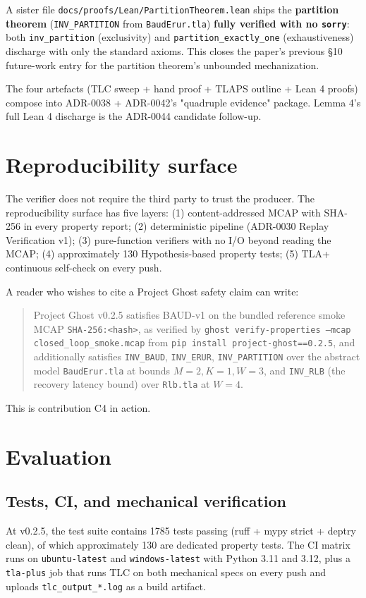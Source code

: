 \documentclass[acmsmall,nonacm=true,review=false]{acmart}
\theoremstyle{plain}
\begin{document}
A sister file
\texttt{docs/proofs/Lean/PartitionTheorem.lean} ships the
\textbf{partition theorem} (\texttt{INV\_PARTITION} from
\texttt{BaudErur.tla}) \textbf{fully verified with no \texttt{sorry}}:
both \texttt{inv\_partition} (exclusivity) and
\texttt{partition\_exactly\_one} (exhaustiveness) discharge with
only the standard axioms. This closes the paper's previous
\S10 future-work entry for the partition theorem's unbounded
mechanization.

The four artefacts (TLC sweep + hand proof + TLAPS outline + Lean
4 proofs) compose into ADR-0038 + ADR-0042's "quadruple evidence"
package. Lemma 4's full Lean 4 discharge is the ADR-0044
candidate follow-up.

\section{Reproducibility surface}
\label{sec:reproducibility}

The verifier does not require the third party to trust the
producer. The reproducibility surface has five layers: (1)
content-addressed
MCAP with SHA-256 in every property report; (2) deterministic
pipeline (ADR-0030 Replay Verification v1); (3) pure-function
verifiers with no I/O beyond reading the MCAP; (4) approximately 130
Hypothesis-based property tests; (5) TLA+ continuous self-check on
every push.

A reader who wishes to cite a Project Ghost safety claim can write:
\begin{quote}\small
Project Ghost v0.2.5 satisfies BAUD-v1 on the bundled reference
smoke MCAP \texttt{SHA-256:<hash>}, as verified by
\texttt{ghost verify-properties --mcap closed\_loop\_smoke.mcap}
from \texttt{pip install project-ghost==0.2.5}, and additionally
satisfies \texttt{INV\_BAUD}, \texttt{INV\_ERUR},
\texttt{INV\_PARTITION} over the abstract model
\texttt{BaudErur.tla} at bounds $M{=}2, K{=}1, W{=}3$, and
\texttt{INV\_RLB} (the recovery latency bound) over
\texttt{Rlb.tla} at $W{=}4$.
\end{quote}
This is contribution C4 in action.

\section{Evaluation}
\label{sec:evaluation}

\subsection{Tests, CI, and mechanical verification}
At v0.2.5, the test suite contains 1785 tests passing (ruff +
mypy strict + deptry clean), of which approximately 130 are
dedicated property tests. The CI matrix runs on
\texttt{ubuntu-latest} and \texttt{windows-latest} with Python
3.11 and 3.12, plus a \texttt{tla-plus} job that runs TLC on both
mechanical specs on every push and uploads
\texttt{tlc\_output\_*.log} as a build artifact.
\end{document}
